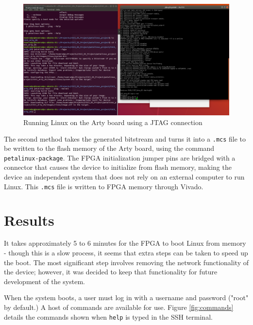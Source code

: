 \documentclass{article}
\begin{document}
\begin{figure}[!htb]
	\centering
	\includegraphics [width=\textwidth] {linux_on_arty.png}
	\caption{Running Linux on the Arty board using a JTAG connection}
	\label{fig:jtag}
\end{figure}

The second method takes the generated bitstream and turns it into a \texttt{.mcs} file to be written to the flash memory of the Arty board, using the command \texttt{petalinux-package}. The FPGA initialization jumper pins are bridged with a connector that causes the device to initialize from flash memory, making the device an independent system that does not rely on an external computer to run Linux. This \texttt{.mcs} file is written to FPGA memory through Vivado.\par


\section{Results}
It takes approximately 5 to 6 minutes for the FPGA to boot Linux from memory - though this is a slow process, it seems that extra steps can be taken to speed up the boot. The most significant step involves removing the network functionality of the device; however, it was decided to keep that functionality for future development of the system.\par
When the system boots, a user must log in with a username and password ("root" by default.) A host of commands are available for use. Figure \ref{fig:commands} details the commands shown when \texttt{help} is typed in the SSH terminal.\par
\end{document}
